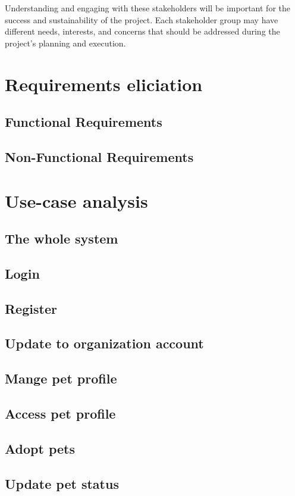 Understanding and engaging with these stakeholders will be important for the success and sustainability of the project. Each stakeholder group may have different needs, interests, and concerns that should be addressed during the project's planning and execution.

\section{Requirements eliciation}
\subsection{Functional Requirements}



\subsection{Non-Functional Requirements}
\section{Use-case analysis}
\subsection{The whole system}
\subsection{Login}
\subsection{Register}
\subsection{Update to organization account}
\subsection{Mange pet profile}
\subsection{Access pet profile}
\subsection{Adopt pets}
\subsection{Update pet status}
